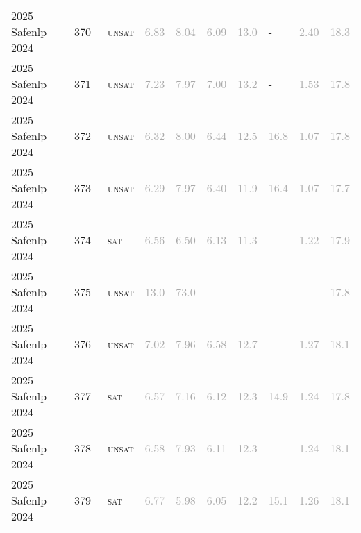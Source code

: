 \begin{center}
{\begin{longtable}{@{}llllllllll@{}}
2025 Safenlp 2024 & 370 & ~\textsc{unsat} & \textcolor{darkgray}{6.83} & \textcolor{darkgray}{8.04} & \textcolor{darkgray}{6.09} & \textcolor{darkgray}{13.0} & - & \textcolor{darkgray}{2.40} & \textcolor{darkgray}{18.3} \\
2025 Safenlp 2024 & 371 & ~\textsc{unsat} & \textcolor{darkgray}{7.23} & \textcolor{darkgray}{7.97} & \textcolor{darkgray}{7.00} & \textcolor{darkgray}{13.2} & - & \textcolor{darkgray}{1.53} & \textcolor{darkgray}{17.8} \\
2025 Safenlp 2024 & 372 & ~\textsc{unsat} & \textcolor{darkgray}{6.32} & \textcolor{darkgray}{8.00} & \textcolor{darkgray}{6.44} & \textcolor{darkgray}{12.5} & \textcolor{darkgray}{16.8} & \textcolor{darkgray}{1.07} & \textcolor{darkgray}{17.8} \\
2025 Safenlp 2024 & 373 & ~\textsc{unsat} & \textcolor{darkgray}{6.29} & \textcolor{darkgray}{7.97} & \textcolor{darkgray}{6.40} & \textcolor{darkgray}{11.9} & \textcolor{darkgray}{16.4} & \textcolor{darkgray}{1.07} & \textcolor{darkgray}{17.7} \\
2025 Safenlp 2024 & 374 & ~\textsc{sat} & \textcolor{darkgray}{6.56} & \textcolor{darkgray}{6.50} & \textcolor{darkgray}{6.13} & \textcolor{darkgray}{11.3} & - & \textcolor{darkgray}{1.22} & \textcolor{darkgray}{17.9} \\
2025 Safenlp 2024 & 375 & ~\textsc{unsat} & \textcolor{darkgray}{13.0} & \textcolor{darkgray}{73.0} & - & - & - & - & \textcolor{darkgray}{17.8} \\
2025 Safenlp 2024 & 376 & ~\textsc{unsat} & \textcolor{darkgray}{7.02} & \textcolor{darkgray}{7.96} & \textcolor{darkgray}{6.58} & \textcolor{darkgray}{12.7} & - & \textcolor{darkgray}{1.27} & \textcolor{darkgray}{18.1} \\
2025 Safenlp 2024 & 377 & ~\textsc{sat} & \textcolor{darkgray}{6.57} & \textcolor{darkgray}{7.16} & \textcolor{darkgray}{6.12} & \textcolor{darkgray}{12.3} & \textcolor{darkgray}{14.9} & \textcolor{darkgray}{1.24} & \textcolor{darkgray}{17.8} \\
2025 Safenlp 2024 & 378 & ~\textsc{unsat} & \textcolor{darkgray}{6.58} & \textcolor{darkgray}{7.93} & \textcolor{darkgray}{6.11} & \textcolor{darkgray}{12.3} & - & \textcolor{darkgray}{1.24} & \textcolor{darkgray}{18.1} \\
2025 Safenlp 2024 & 379 & ~\textsc{sat} & \textcolor{darkgray}{6.77} & \textcolor{darkgray}{5.98} & \textcolor{darkgray}{6.05} & \textcolor{darkgray}{12.2} & \textcolor{darkgray}{15.1} & \textcolor{darkgray}{1.26} & \textcolor{darkgray}{18.1} \\

\end{longtable}}
\end{center}
